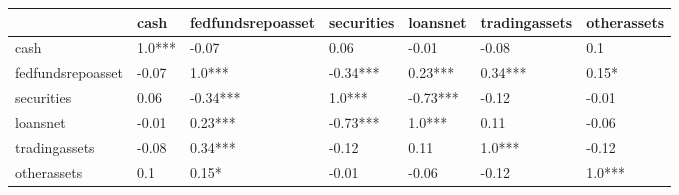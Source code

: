 \begin{tabular}{lllllll}
\toprule
{} &    cash & fedfundsrepoasset & securities &  loansnet & tradingassets & otherassets \\
\midrule
cash              &  1.0*** &             -0.07 &       0.06 &     -0.01 &         -0.08 &         0.1 \\
fedfundsrepoasset &   -0.07 &            1.0*** &   -0.34*** &   0.23*** &       0.34*** &       0.15* \\
securities        &    0.06 &          -0.34*** &     1.0*** &  -0.73*** &         -0.12 &       -0.01 \\
loansnet          &   -0.01 &           0.23*** &   -0.73*** &    1.0*** &          0.11 &       -0.06 \\
tradingassets     &   -0.08 &           0.34*** &      -0.12 &      0.11 &        1.0*** &       -0.12 \\
otherassets       &     0.1 &             0.15* &      -0.01 &     -0.06 &         -0.12 &      1.0*** \\
\bottomrule
\end{tabular}

